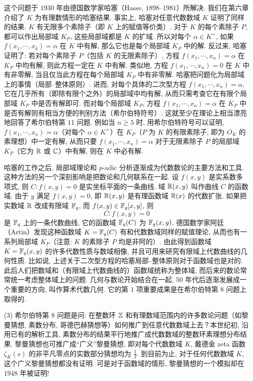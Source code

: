 这个问题于 $1930$ 年由德国数学家哈塞（Hasse, $1898$--$1981$）所解决. 我们在第六章介绍了 $K$ 为有理数情形的哈塞结果. 事实上, 哈塞对任意代数数域 $K$ 证明了同样的结果. $K$ 有无限多个素除子（即 $K$ 上的赋值等价类）. 对于 $K$ 的每个素除子 $P$, 都可以作出局部域 $K_P$, 这些局部域都是 $K$ 的扩域. 所以对每个 $\alpha\in K^{\times}$, 如果 $f(x_1,\cdots,x_k)=\alpha$ 在 $K$ 中有解, 那么它也是每个局部域 $K_P$ 中的解. 反过来, 哈塞证明了: 若对每个素除子 $P$（包括 $K$ 的无限素除子）, 方程 $f(x_1,\cdots,x_n)=\alpha$ 在 $K_P$ 中均有解, 则此方程一定在 $K$ 中有解. 类似地, 方程 $f(x_1,\cdots,x_n)=0$ 在 $K$ 中有非零解, 当且仅当此方程在每个局部域 $K_P$ 中有非零解. 哈塞把问题化为局部域上的事情（局部--整体原则）. 进而, 对每个具体的二次型方程 $f(x_1,\cdots,x_n)=\alpha$, 它在几乎所有（即除有限个之外）的局部域中均有解, 从而只需考查它在有限个局部域 $K_P$ 中是否有解即可. 而对每个局部域 $K_P$, 方程 $f(x_1,\cdots,x_n)=\alpha$ 在 $K_P$ 中是否有解则有相当方便的判别方法（希尔伯特符号）. 这就至少在理论上相当漂亮地回答了希尔伯特第 $11$ 问题. 例如当 $n\geqslant 5$ 时, 用希尔伯特符号可以证明, $f(x_1,\cdots,x_n)=\alpha$（对每个 $\alpha\in K^{\times}$）在 $K_P$（$P$ 为 $K$ 的有限素除子, 即为 $O_K$ 的素理想）中一定有解, 从而只要 $f(x_1,\cdots,x_n)=\alpha$ 对于无限素除子 $P$ 的局部域 $K_P$（它为 $\mathbb{R}$ 或 $\mathbb{C}$）中有解, 则在 $K$ 中必有解.

哈塞的工作之后, 局部域理论和 $p$-adic 分析逐渐成为代数数论的主要方法和工具. 这种方法的另一个深刻影响是把数论和几何联系在一起. 设 $f(x,y)$ 是实系数多项式, 则 $C\colon f(x,y)=0$ 是实坐标平面的一条曲线. 域 $\mathbb{R}(x,y)$ 叫作曲线 $C$ 的函数域. 由于 $y$ 满足 $f(x,y)=0$, 即 $\mathbb{R}(x,y)$ 是有理函数域 $\mathbb{R}(x)$ 的代数扩张. 如果把实数域 $\mathbb{R}$ 改成有限域 $\mathbb{F}_q$, 而 $f(x,y)\in\mathbb{F}_q[x,y]$, 则
\[
  C\colon f(x,y)=0
\]
是 $\mathbb{F}_q$ 上的一条代数曲线, 它的函数域 $\mathbb{F}_q(C)$ 为 $\mathbb{F}_q(x,y)$. 德国数学家阿廷（Artin）发现这种函数域 $K=\mathbb{F}_q(C)$ 有和代数数域同样的赋值理论, 从而也有一系列局部域 $K_P$（注意: $K$ 的素除子 $P$ 均是非阿的）. 由此得到函数域 $K=\mathbb{F}_q(x,y)$ 的许多代数性质与数域相像, 并且可用来研究有限域上代数曲线的几何性质. 比如说, 上述关于二次型方程的哈塞局部--整体原则对于函数域也是对的. 此后人们把数域和（有限域上代数曲线的）函数域统称为整体域, 而后来的数论常常统一考虑整体域上的问题. 几何与数论开始结合在一起, $50$ 年代后逐渐发展成一个重要的方向, 叫作算术代数几何. 它的第 $1$ 项重要成果是在希尔伯特第 $8$ 问题上取得的.

(3) 希尔伯特第 $8$ 问题是问: 在整数环 $\mathbb{Z}$ 和有理数域范围内的许多数论问题（如黎曼猜想, 素数分布, 哥德巴赫猜想等）如何推广到任意代数数域上去？本世纪初, 沿用已有的解析工具, 素数分布的结果平行地推广成代数数域的整数环素理想分布结果. 黎曼猜想也可推广成``广义''黎曼猜想, 即对每个代数数域 $K$, 戴德金 zeta 函数 $\zeta_K(s)$ 的非平凡零点的实数部分猜想均为 $\frac{1}{2}$. 到目前为止, 对于任何代数数域 $K$, 这个广义黎曼猜想都没有证明. 可是对于函数域的情形, 黎曼猜想的一个模拟却在 $1948$ 年被证明!


